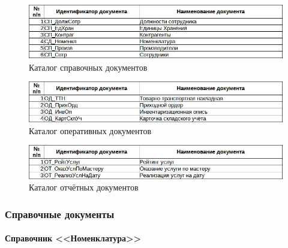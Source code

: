 \documentclass[12pt, a4paper, simple]{eskdtext}
\begin{document}

    \begin{figure}[!h]
        \centering
        \includegraphics[width=14cm]
            {_docs/СП_.jpg}
        \caption{Каталог справочных документов}
        \label{fig:CP_}
    \end{figure}

    
    \begin{figure}[!h]
        \centering
        \includegraphics[width=14cm]
            {_docs/ОП_.jpg}
        \caption{Каталог оперативных документов}
        \label{fig:OP_}
    \end{figure}

    
    \begin{figure}[!h]
        \centering
        \includegraphics[width=14cm]
            {_docs/ОТ_.jpg}
        \caption{Каталог отчётных документов}
        \label{fig:OT_}
    \end{figure}

    \newpage

    \subsubsection{Справочные документы}

    \paragraph{} \textbf{Справочник <<Номенклатура>>}
\end{document}
